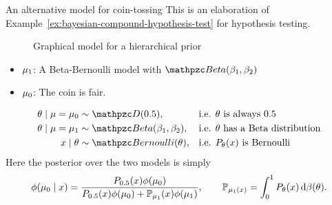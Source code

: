 \begin{frame}
\begin{example}{An alternative model for coin-tossing}
  This is an elaboration of Example~\ref{ex:bayesian-compound-hypothesis-test} for hypothesis testing.
  \begin{figure}[H]
    \centering
    \caption{Graphical model for a hierarchical prior}
  \end{figure}
  \begin{itemize}
  \item $\mu_1$: A Beta-Bernoulli model with $\BetaDist(\bel_1, \bel_2)$
  \item $\mu_0$: The coin is fair.
  \end{itemize}
  \begin{align}
    \param \mid \model = \model_0 &\sim \Singular(0.5), && \textrm{i.e. $\param$ is always 0.5}\\
    \param \mid \model = \model_1 &\sim \BetaDist(\bel_1, \bel_2), && \textrm{i.e. $\param$ has a Beta distribution}\\
    x \mid \param &\sim \Bernoulli(\param), && \textrm{i.e. $P_\param(x)$ is Bernoulli}
  \end{align}
  Here the posterior over the two models is simply
  \[
  \phi(\mu_0 \mid x) = \frac{P_{0.5}(x) \phi(\mu_0)}{P_{0.5}(x) \phi(\mu_0) + \mathop{\mbox{\ensuremath{\mathbb{P}}}}\nolimits_{\mu_1}(x) \phi(\mu_1)},
  \qquad
  \mathop{\mbox{\ensuremath{\mathbb{P}}}}\nolimits_{\mu_1(x)} = \int_0^1 P_\theta(x) \,\mathrm{d} \beta(\theta).
  \]
\end{example}

\end{frame}

